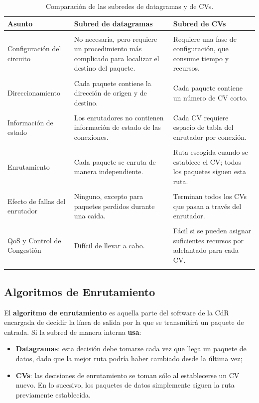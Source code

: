 \documentclass[10pt,a4paper]{article}
\begin{document}
\begin{table}[h]
\centering
\begin{tabular}{ p{3cm}  p{6cm}  p{6cm} }
\hline
\textbf{Asunto} & \textbf{Subred de datagramas} & \textbf{Subred de CVs} \\
\hline \\[-1.5ex]
Configuración del circuito &
No necesaria, pero requiere un procedimiento más complicado para localizar el destino del paquete. &
Requiere una fase de configuración, que consume tiempo y recursos. \\[1ex]\hline\\[-1.5ex]
Direccionamiento &
Cada paquete contiene la dirección de origen y de destino. &
Cada paquete contiene un número de CV corto. \\[1ex]\hline\\[-1.5ex]
Información de estado &
Los enrutadores no contienen información de estado de las conexiones. &
Cada CV requiere espacio de tabla del enrutador por conexión. \\[1ex]\hline\\[-1.5ex]
Enrutamiento &
Cada paquete se enruta de manera independiente. &
Ruta escogida cuando se establece el CV; todos los paquetes siguen esta ruta. \\[1ex]\hline\\[-1.5ex]
Efecto de fallas del enrutador &
Ninguno, excepto para paquetes perdidos durante una caída. &
Terminan todos los CVs que pasan a través del enrutador. \\[1ex]\hline\\[-1.5ex]
QoS y Control de Congestión &
Difícil de llevar a cabo. &
Fácil si se pueden asignar suficientes recursos por adelantado para cada CV. \\[1ex]\hline\\[-1.5ex]
\end{tabular}
\caption{Comparación de las subredes de datagramas y de CVs.}
\label{tab:comp_subredes}
\end{table}

\subsection{Algoritmos de Enrutamiento}

El \textbf{algoritmo de enrutamiento} es aquella parte del software de la CdR encargada de decidir la línea de salida por la que se transmitirá un paquete de entrada. Si la subred de manera interna \textbf{usa}:
\begin{itemize}
\item \textbf{Datagramas}: esta decisión debe tomarse cada vez que llega un paquete de datos, dado que la mejor ruta podría haber cambiado desde la última vez;
\item \textbf{CVs}: las decisiones de enrutamiento se toman sólo al establecerse un CV nuevo. En lo sucesivo, los paquetes de datos simplemente siguen la ruta previamente establecida.
\end{itemize}
\end{document}
